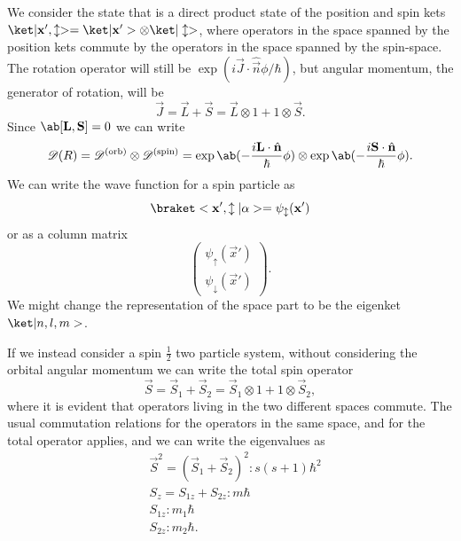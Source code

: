 We consider the state that is a direct product state of the position and spin kets $\k{\vec{x}', \updownarrow} = \k{\vec{x}'} \otimes \k{\updownarrow}$, where operators in the space spanned by the position kets commute by the operators in the space spanned by the spin-space. The rotation operator will still be $\exp(i \vec{J}\cdot\hat{\vec{n}} \phi / \hbar)$, but angular momentum, the generator of rotation, will be
\begin{equation}
    \vec{J} = \vec{L} + \vec{S} = \vec{L} \otimes 1 + 1 \otimes \vec{S}.
\end{equation}
Since $\comm{\vec{L}}{\vec{S}}=0$ we can write
\begin{equation}
    \mathscr{D}(R) = \mathscr{D}^{(\text{orb})} \otimes \mathscr{D}^{(\text{spin})} = \exp\ab(- \frac{i \vec{L} \cdot\hat{\vec{n}}}{\hbar} \phi) \otimes \exp\ab(- \frac{i \vec{S} \cdot\hat{\vec{n}}}{\hbar} \phi).
\end{equation}
We can write the wave function for a spin particle as 
\begin{equation}
    \bk{\vec{x}', \updownarrow}{\alpha} = \psi_\updownarrow(\vec{x}')
\end{equation}
or as a column matrix
\begin{equation}
    \begin{pmatrix}
        \psi_\uparrow(\vec{x}')\\
        \psi_\downarrow(\vec{x}')
    \end{pmatrix}.
\end{equation}
We might change the representation of the space part to be the eigenket $\k{n,l,m}$.

If we instead consider a spin $\frac{1}{2}$ two particle system, without considering the orbital angular momentum we can write the total spin operator
\begin{equation}
    \vec{S} = \vec{S}_1 + \vec{S}_2 = \vec{S}_1 \otimes 1 + 1 \otimes \vec{S}_2,
\end{equation}
where it is evident that operators living in the two different spaces commute. The usual commutation relations for the operators in the same space, and for the total operator applies, and we can write the eigenvalues as 
\begin{align}
    &\vec{S}^2 = (\vec{S}_1 + \vec{S}_2)^2 : s(s+1)\hbar^2\\
    &S_z = S_{1z} + S_{2z} : m \hbar\\
    &S_{1z} : m_1\hbar\\
    &S_{2z} : m_2\hbar.
\end{align}


